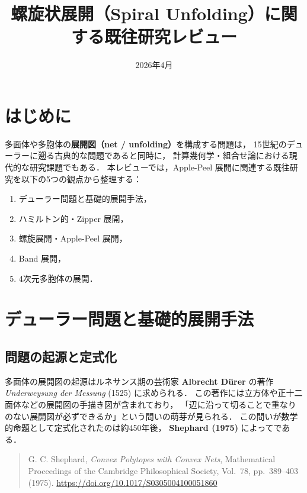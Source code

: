 \documentclass[a4paper,11pt]{article}
\title{螺旋状展開（Spiral Unfolding）に関する既往研究レビュー}
\author{}
\date{2026年4月}
\begin{document}
\maketitle
\tableofcontents
\bigskip

\section{はじめに}

多面体や多胞体の\textbf{展開図（net / unfolding）}を構成する問題は，
15世紀のデューラーに遡る古典的な問題であると同時に，
計算幾何学・組合せ論における現代的な研究課題でもある．
本レビューでは，Apple-Peel 展開に関連する既往研究を以下の5つの観点から整理する：
\begin{enumerate}[nosep]
  \item デューラー問題と基礎的展開手法，
  \item ハミルトン的・Zipper 展開，
  \item 螺旋展開・Apple-Peel 展開，
  \item Band 展開，
  \item 4次元多胞体の展開．
\end{enumerate}

\section{デューラー問題と基礎的展開手法}

\subsection{問題の起源と定式化}

多面体の展開図の起源はルネサンス期の芸術家 \textbf{Albrecht Dürer} の著作
\textit{Underweysung der Messung} (1525) に求められる．
この著作には立方体や正十二面体などの展開図の手描き図が含まれており，
「辺に沿って切ることで重なりのない展開図が必ずできるか」という問いの萌芽が見られる．
この問いが数学的命題として定式化されたのは約450年後，
\textbf{Shephard (1975)} によってである．

\begin{quotation}\noindent
  G. C. Shephard,
  \textit{Convex Polytopes with Convex Nets},
  Mathematical Proceedings of the Cambridge Philosophical Society,
  Vol.~78, pp.~389--403 (1975).
  \url{https://doi.org/10.1017/S0305004100051860}
\end{quotation}
\end{document}
